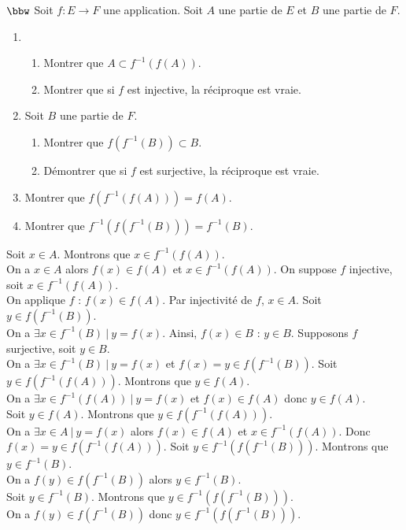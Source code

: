\documentclass[11pt]{article}
\begin{document}
\begin{exercice}{$\bbw$}{}
    Soit $f:E\to F$ une application. Soit $A$ une partie de $E$ et $B$ une partie de $F$.
    \begin{enumerate}
        \item \begin{enumerate}
            \item Montrer que $A \subset f^{-1}(f(A))$.
            \item Montrer que si $f$ est injective, la réciproque est vraie.
        \end{enumerate}
        \item Soit $B$ une partie de $F$. \begin{enumerate}
            \item Montrer que $f(f^{-1}(B)) \subset B$.
            \item Démontrer que si $f$ est surjective, la réciproque est vraie.
        \end{enumerate}
        \item Montrer que $f(f^{-1}(f(A))) = f(A)$.
        \item Montrer que $f^{-1}(f(f^{-1}(B)))=f^{-1}(B)$.
    \end{enumerate}
    \tcblower
     Soit $x\in A$. Montrons que $x\in f^{-1}(f(A))$.\\
    On a $x\in A$ alors $f(x) \in f(A)$ et $x\in f^{-1}(f(A))$.\n
     On suppose $f$ injective, soit $x \in f^{-1}(f(A))$.\\
    On applique $f$ : $f(x) \in f(A)$. Par injectivité de $f$, $x \in A$.\n
     Soit $y \in f(f^{-1}(B))$.\\
    On a $\exists x \in f^{-1}(B) ~ | ~ y = f(x)$. Ainsi, $f(x)\in B$ : $y\in B$.\n
     Supposons $f$ surjective, soit $y\in B$.\\
    On a $\exists x \in f^{-1}(B) ~ | ~ y = f(x)$ et $f(x) = y \in f(f^{-1}(B))$.\n
     Soit $y\in f(f^{-1}(f(A)))$. Montrons que $y\in f(A)$.\\
    On a $\exists x \in f^{-1}(f(A)) ~ | ~ y = f(x)$ et $f(x) \in f(A)$ donc $y \in f(A)$.\\
    Soit $y\in f(A)$. Montrons que $y\in f(f^{-1}(f(A)))$.\\
    On a $\exists x \in A ~ | ~ y = f(x)$ alors $f(x) \in f(A)$ et $x\in f^{-1}(f(A))$. Donc $f(x) = y \in f(f^{-1}(f(A)))$.\n
     Soit $y \in f^{-1}(f(f^{-1}(B)))$. Montrons que $y \in f^{-1}(B)$.\\
    On a $f(y) \in f(f^{-1}(B))$ alors $y \in f^{-1}(B)$.\\
    Soit $y\in f^{-1}(B)$. Montrons que $y\in f^{-1}(f(f^{-1}(B)))$.\\
    On a $f(y) \in f(f^{-1}(B))$ donc $y \in f^{-1}(f(f^{-1}(B)))$.
\end{exercice}
\end{document}
